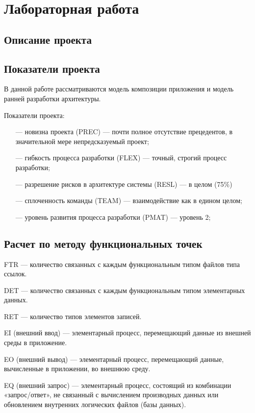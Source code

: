 \chapter{Лабораторная работа}

\section{Описание проекта}

\section{Показатели проекта}

В данной работе рассматриваются модель композиции приложения и модель ранней разработки архитектуры. 

Показатели проекта:
\begin{itemize}
    \item[---] новизна проекта (PREC) --- почти полное отсутствие прецедентов, в значительной мере непредсказуемый проект;
    \item[---] гибкость процесса разработки (FLEX) --- точный, строгий процесс разработки;
    \item[---] разрешение рисков в архитектуре системы (RESL) --- в целом (75\%)
    \item[---] сплоченность команды (TEAM) --- взаимодействие как в едином целом;
    \item[---] уровень развития процесса разработки (PMAT) --- уровень 2;
\end{itemize}

\section{Расчет по методу функциональных точек}

FTR --- количество связанных с каждым функциональным типом файлов типа ссылок.

DET --- количество связанных с каждым функциональным типом элементарных данных.

RET --- количество типов элементов записей.

EI (внешний ввод) --- элементарный процесс, перемещающий данные из внешней среды в приложение.

EO (внешний вывод) --- элементарный процесс, перемещающий данные, вычисленные в приложении, во внешнюю среду.

EQ (внешний запрос) --- элементарный процесс, состоящий из комбинации «запрос/ответ», не связанный с вычислением производных данных или обновлением внутренних логических файлов (базы данных).

